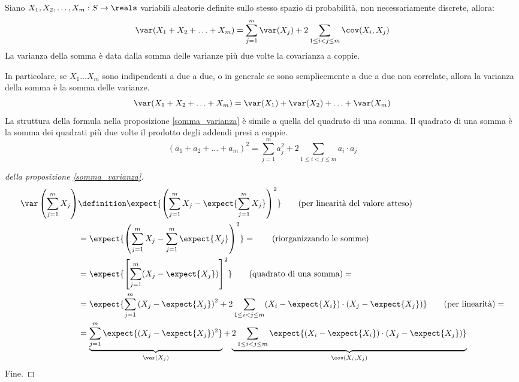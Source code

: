 \begin{prop}\label{somma_varianza}
Siano $X_1, X_2, \ldots, X_m : S \to \reals$ variabili aleatorie definite sullo stesso spazio di probabilit\`a, non necessariamente discrete, allora:
\[
\var (X_1 + X_2 + \ldots + X_m) = 
\sum_{j = 1}^{m} \var (X_j) + 2 \sum_{1 \le i < j \le m} \cov (X_i, X_j)
\]
La varianza della somma \`e data dalla somma delle varianze pi\`u due volte la covarianza a coppie.
\end{prop}
In particolare, se $X_1 \ldots X_m$ sono indipendenti a due a due, o in generale se sono semplicemente a due a due non correlate, allora la varianza della somma \`e la somma delle varianze.
\[
\var (X_1 + X_2 + \ldots + X_m) = \var (X_1) + \var (X_2) + \ldots + \var (X_m)
\]
La struttura della formula nella proposizione \ref{somma_varianza} \`e simile a quella del quadrato di una somma. Il quadrato di una somma \`e la somma dei quadrati pi\`u due volte il prodotto degli addendi presi a coppie.
\[
(a_1 + a_2 + \ldots + a_m)^2 = \sum_{j = 1}^{m} a_j^2 + 2 \sum_{1 \le i < j \le m} a_i \cdot a_j
\]
\begin{proof}[della proposizione \ref{somma_varianza}]
\begin{align*}
\var \left( \sum_{j = 1}^{m} X_j \right) &\definition
\expect{ {\left( \sum_{j = 1}^{m} X_j - \expect{\sum_{j = 1}^{m} X_j} \right)}^2 } \tag{per linearit\`a del valore atteso} \\
&= \expect{ {\left( \sum_{j = 1}^{m} X_j - \sum_{j = 1}^{m} \expect{X_j} \right)}^2 }  = \tag{riorganizzando le somme} \\
&= \expect{ {\left[ \sum_{j = 1}^{m} (X_j - \expect{X_j}) \right]}^2 } \tag{quadrato di una somma} = \\
&= \expect{ \sum_{j = 1}^{m} {\left( X_j - \expect{X_j} \right)}^2 + 2 \sum_{1 \le i < j \le m} (X_i - \expect{X_i}) \cdot (X_j - \expect{X_j}) } \tag{per linearit\`a} = \\
&= \underbrace{\sum_{j = 1}^{m} \expect{(X_j - \expect{X_j})^2}}_{\var (X_j)} + \underbrace{2 \sum_{1 \le i < j \le m} \expect{(X_i - \expect{X_i}) \cdot (X_j - \expect{X_j})}}_{\cov (X_i, X_j)}
\end{align*}
Fine.
\end{proof}

